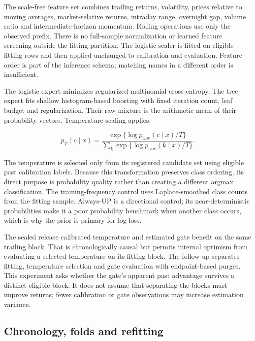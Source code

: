 \documentclass[11pt,a4paper]{article}
\begin{document}


The scale-free feature set combines trailing returns, volatility, prices relative to moving averages, market-relative returns, intraday range, overnight gap, volume ratio and intermediate-horizon momentum. Rolling operations use only the observed prefix. There is no full-sample normalization or learned feature screening outside the fitting partition. The logistic scaler is fitted on eligible fitting rows and then applied unchanged to calibration and evaluation. Feature order is part of the inference schema; matching names in a different order is insufficient.

The logistic expert minimizes regularized multinomial cross-entropy. The tree expert fits shallow histogram-based boosting with fixed iteration count, leaf budget and regularization. Their raw mixture is the arithmetic mean of their probability vectors. Temperature scaling applies:

\begin{equation}\label{eq:temperature}p_T(c\mid x)=\frac{\exp\{\log p_{\mathrm{raw}}(c\mid x)/T\}}{\sum_k\exp\{\log p_{\mathrm{raw}}(k\mid x)/T\}}.\end{equation}

The temperature is selected only from its registered candidate set using eligible past calibration labels. Because this transformation preserves class ordering, its direct purpose is probability quality rather than creating a different argmax classification. The training-frequency control uses Laplace-smoothed class counts from the fitting sample. Always-UP is a directional control; its near-deterministic probabilities make it a poor probability benchmark when another class occurs, which is why the prior is primary for log loss.

The sealed release calibrated temperature and estimated gate benefit on the same trailing block. That is chronologically causal but permits internal optimism from evaluating a selected temperature on its fitting block. The follow-up separates fitting, temperature selection and gate evaluation with endpoint-based purges. This experiment asks whether the gate's apparent past advantage survives a distinct eligible block. It does not assume that separating the blocks must improve returns; fewer calibration or gate observations may increase estimation variance.

\subsection{Chronology, folds and refitting}
\end{document}
